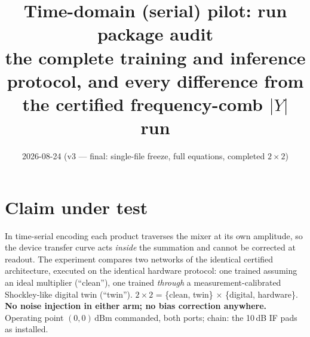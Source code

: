 \documentclass[11pt]{article}
\title{Time-domain (serial) pilot: run package audit\\
\large the complete training and inference protocol, and every
difference from the certified frequency-comb $|Y|$ run}
\date{2026-08-24 (v3 --- final: single-file freeze, full equations,
completed $2\times2$)}
\newcommand{\dbm}{\ensuremath{\,\mathrm{dBm}}}
\begin{document}
\maketitle
\vspace{-2em}

\section{Claim under test}
In time-serial encoding each product traverses the mixer at its own
amplitude, so the device transfer curve acts \emph{inside} the
summation and cannot be corrected at readout. The experiment compares
two networks of the identical certified architecture, executed on the
identical hardware protocol: one trained assuming an ideal multiplier
(``clean''), one trained \emph{through} a measurement-calibrated
Shockley-like digital twin (``twin''). $2\times2$ = \{clean, twin\}
$\times$ \{digital, hardware\}. \textbf{No noise injection in either
arm; no bias correction anywhere.} Operating point $(0,0)$\dbm{}
commanded, both ports; chain: the 10\,dB IF pads as installed.
\end{document}
